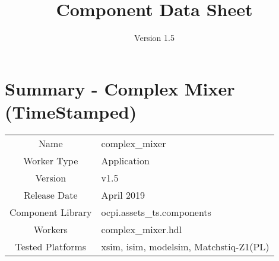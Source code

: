 \iffalse
This file is protected by Copyright. Please refer to the COPYRIGHT file
distributed with this source distribution.

This file is part of OpenCPI <http://www.opencpi.org>

OpenCPI is free software: you can redistribute it and/or modify it under the
terms of the GNU Lesser General Public License as published by the Free Software
Foundation, either version 3 of the License, or (at your option) any later
version.

OpenCPI is distributed in the hope that it will be useful, but WITHOUT ANY
WARRANTY; without even the implied warranty of MERCHANTABILITY or FITNESS FOR A
PARTICULAR PURPOSE. See the GNU Lesser General Public License for more details.

You should have received a copy of the GNU Lesser General Public License along
with this program. If not, see <http://www.gnu.org/licenses/>.
\fi

\def\importpath{../../../imports/ocpi.assets/components/dsp_comps/complex_mixer.test/doc/}

\def\docTitle{Component Data Sheet}
\def\docVersion{1.5}
\date{Version \docVersion} %
\title{\docTitle}
\lhead{\small{\docTitle}}

\def\comp{complex\_mixer}
\edef\ecomp{complex_mixer}
\def\Comp{Complex Mixer (TimeStamped)}
\graphicspath{ {figures/} }



\section*{Summary - \Comp}
\begin{tabular}{|c|M{13.5cm}|}
	\hline
	                  & \\
	\hline
	Name              & \comp \\
	\hline
	Worker Type       & Application \\
	\hline
	Version           & v\docVersion \\
	\hline
	Release Date      & April 2019 \\
	\hline
	Component Library & ocpi.assets\_ts.components \\
	\hline
	Workers           & \comp.hdl \\
	\hline
	Tested Platforms  & xsim, isim, modelsim, Matchstiq-Z1(PL) \\
	\hline
\end{tabular}

